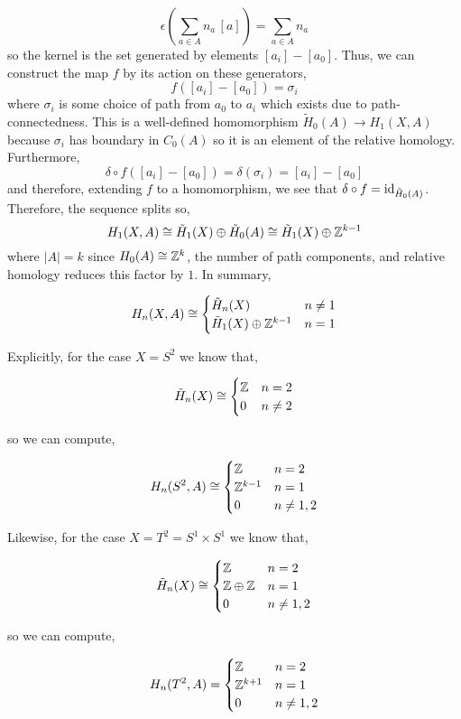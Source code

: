 \documentclass[12pt]{extarticle}
\begin{document}
\begin{enumerate}
\[ \epsilon \left( \sum_{a \in A} n_a \, [a] \right) = \sum_{a \in A} n_a \]
so the kernel is the set generated by elements $[a_i] - [a_0]$. Thus, we can construct the map $f$ by its action on these generators,
\[ f([a_i] - [a_0]) = \sigma_i \]
where $\sigma_i$ is some choice of path from $a_0$ to $a_i$ which exists due to path-connectedness. This is a well-defined homomorphism $\tilde{H}_0(A) \to H_1(X, A)$ because $\sigma_i$ has boundary in $C_0(A)$ so it is an element of the relative homology. Furthermore,
\[ \delta \circ f([a_i] - [a_0]) = \delta(\sigma_i) = [a_i] - [a_0] \]
and therefore, extending $f$ to a homomorphism, we see that $\delta \circ f = \mathrm{id}_{\tilde{H}_0(A)}$. Therefore, the sequence splits so,
\[ H_1(X, A) \cong \tilde{H}_1(X) \oplus \tilde{H}_0(A) \cong \tilde{H}_1(X) \oplus \mathbb{Z}^{k-1} \]
where $|A| = k$ since $H_0(A) \cong \mathbb{Z}^k$, the number of path components, and relative homology reduces this factor by $1$. 
In summary,

\[ H_n(X, A) \cong
\begin{cases}
\tilde{H}_n(X) & n \neq 1 \\
\tilde{H}_1(X) \oplus \mathbb{Z}^{k-1} & n = 1
\end{cases} \]

Explicitly, for the case $X = S^2$ we know that,

\[ \tilde{H}_n(X) \cong
\begin{cases}
\mathbb{Z} & n = 2 \\
0 & n \neq 2
\end{cases} \]

so we can compute,

\[ H_n(S^2, A) \cong
\begin{cases}
\mathbb{Z} & n = 2 \\
\mathbb{Z}^{k-1} & n = 1 \\
0 & n \neq 1, 2
\end{cases} \]

Likewise, for the case $X = T^2 = S^1 \times S^1$ we know that,

\[ \tilde{H}_n(X) 
\cong
\begin{cases}
\mathbb{Z}    &  n = 2 \\
\mathbb{Z} \oplus \mathbb{Z} &  n = 1 \\
0 & n \neq 1, 2
\end{cases} \]

so we can compute,

\[ H_n(T^2, A) = \begin{cases}
\mathbb{Z} & n = 2 \\
\mathbb{Z}^{k+1} & n = 1 \\
0 & n \neq 1, 2
\end{cases} \]
  


\end{enumerate}
\end{document}

